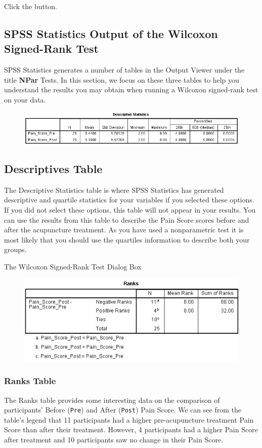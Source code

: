 \documentclass[]{article}
\begin{document}
Click the  button.

\subsection*{SPSS Statistics Output of the Wilcoxon Signed-Rank Test}
SPSS Statistics generates a number of tables in the Output Viewer under the title \textbf{NPar} Tests. In this section, we focus on these three tables to help you understand the results you may obtain when running a Wilcoxon signed-rank test on your data.
\begin{figure}
\centering
\includegraphics[width=0.7\linewidth]{images/wilcoxon-signed-rank-test-output-1}
\caption{}
\label{fig:wilcoxon-signed-rank-test-output-1}
\end{figure}

\subsection*{Descriptives Table}
The Descriptive Statistics table is where SPSS Statistics has generated descriptive and quartile statistics for your variables if you selected these options. If you did not select these options, this table will not appear in your results. You can use the results from this table to describe the Pain Score scores before and after the acupuncture treatment. As you have used a nonparametric test it is most likely that you should use the quartiles information to describe both your groups.

The Wilcoxon Signed-Rank Test Dialog Box
\begin{figure}
\centering
\includegraphics[width=0.7\linewidth]{images/wilcoxon-signed-rank-test-output-2}
\caption{}
\label{fig:wilcoxon-signed-rank-test-output-2}
\end{figure}

\subsubsection*{Ranks Table}
The Ranks table provides some interesting data on the comparison of participants' Before (\texttt{Pre}) and After (\texttt{Post}) Pain Score. We can see from the table's legend that 11 participants had a higher pre-acupuncture treatment Pain Score than after their treatment. However, 4 participants had a higher Pain Score after treatment and 10 participants saw no change in their Pain Score.
\end{document}
